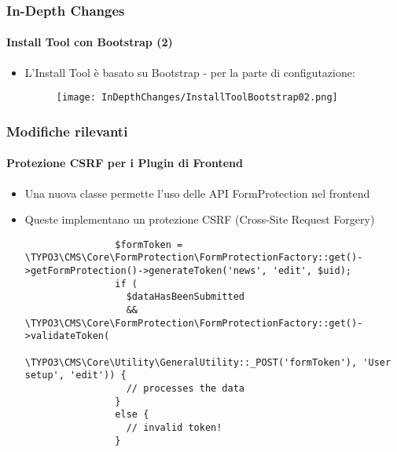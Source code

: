
\begin{frame}[fragile]
	\frametitle{In-Depth Changes}
	\framesubtitle{Install Tool con Bootstrap (2)}

	\begin{itemize}

		\item L'Install Tool è basato su Bootstrap - per la parte di configutazione:

			\begin{figure}
				\texttt{[image: InDepthChanges/InstallToolBootstrap02.png]}
			\end{figure}

	\end{itemize}

\end{frame}


\begin{frame}[fragile]
	\frametitle{Modifiche rilevanti}
	\framesubtitle{Protezione CSRF per i Plugin di Frontend}

	\lstset{basicstyle=\tiny\ttfamily}

	\begin{itemize}

		\item Una nuova classe permette l'uso delle API FormProtection nel frontend

		\item Queste implementano un protezione CSRF (Cross-Site Request Forgery)

			\begin{lstlisting}
				$formToken = \TYPO3\CMS\Core\FormProtection\FormProtectionFactory::get()->getFormProtection()->generateToken('news', 'edit', $uid);
				if (
				  $dataHasBeenSubmitted
				  && \TYPO3\CMS\Core\FormProtection\FormProtectionFactory::get()->validateToken(
				    \TYPO3\CMS\Core\Utility\GeneralUtility::_POST('formToken'), 'User setup', 'edit')) {
				  // processes the data
				}
				else {
				  // invalid token!
				}
			\end{lstlisting}

	\end{itemize}

\end{frame}

